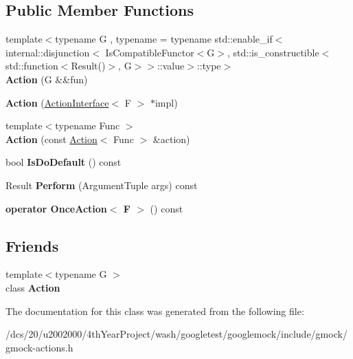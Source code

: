 \subsection*{Public Member Functions}
\begin{DoxyCompactItemize}
\item 
\mbox{\label{classtesting_1_1Action_3_01R_07Args_8_8_8_08_4_af914512c3ac196b70a1e838936d67694}} 
{\footnotesize template$<$typename G , typename  = typename std\+::enable\+\_\+if$<$internal\+::disjunction$<$          Is\+Compatible\+Functor$<$\+G$>$, std\+::is\+\_\+constructible$<$std\+::function$<$\+Result()$>$,                                                        G$>$$>$\+::value$>$\+::type$>$ }\\{\bfseries Action} (G \&\&fun)
\item 
\mbox{\label{classtesting_1_1Action_3_01R_07Args_8_8_8_08_4_ae93a407342a218c8453bd8c83c63cafc}} 
{\bfseries Action} (\mbox{\hyperlink{classtesting_1_1ActionInterface}{Action\+Interface}}$<$ F $>$ $\ast$impl)
\item 
\mbox{\label{classtesting_1_1Action_3_01R_07Args_8_8_8_08_4_a78a303bc55021bdb106bf1c647c84f83}} 
{\footnotesize template$<$typename Func $>$ }\\{\bfseries Action} (const \mbox{\hyperlink{classtesting_1_1Action}{Action}}$<$ Func $>$ \&action)
\item 
\mbox{\label{classtesting_1_1Action_3_01R_07Args_8_8_8_08_4_a5ef3b75cf7a5baf83885f10aef2950bd}} 
bool {\bfseries Is\+Do\+Default} () const
\item 
\mbox{\label{classtesting_1_1Action_3_01R_07Args_8_8_8_08_4_a84c4919e5d1691584bbd37c5aaf48f30}} 
Result {\bfseries Perform} (Argument\+Tuple args) const
\item 
\mbox{\label{classtesting_1_1Action_3_01R_07Args_8_8_8_08_4_a26420b4b57d321235fb50bbf498e95a9}} 
{\bfseries operator Once\+Action$<$ F $>$} () const
\end{DoxyCompactItemize}
\subsection*{Friends}
\begin{DoxyCompactItemize}
\item 
\mbox{\label{classtesting_1_1Action_3_01R_07Args_8_8_8_08_4_a62bc48ff11968b6e45d21c4b49f349fb}} 
{\footnotesize template$<$typename G $>$ }\\class {\bfseries Action}
\end{DoxyCompactItemize}


The documentation for this class was generated from the following file\+:\begin{DoxyCompactItemize}
\item 
/dcs/20/u2002000/4th\+Year\+Project/wash/googletest/googlemock/include/gmock/gmock-\/actions.\+h\end{DoxyCompactItemize}
